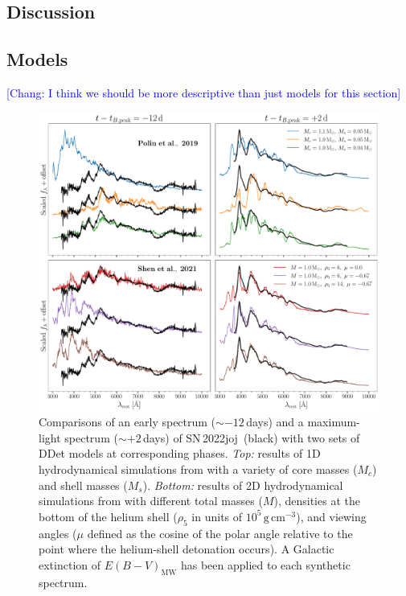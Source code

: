 \documentclass[twocolumn]{aastex631}
\newcommand{\sn}{SN\,2022joj}
\newcommand{\chang}[1]{\textcolor{blue}{[Chang: #1]}}
\begin{document}
\begin{CJK*}{UTF8}{gbsn}
\section{Discussion} \label{sec:discussion}
\subsection{Models} \label{sec:model}

\chang{I think we should be more descriptive than just models for this section}

\begin{figure}
    \centering
    \includegraphics[width=\linewidth]{model_comparison_spec.pdf}
    \caption{Comparisons of an early spectrum ($\sim$$-12$\,days) and a maximum-light spectrum ($\sim$$+2$\,days) of \sn\ (black) with two sets of DDet models at corresponding phases. \textit{Top:} results of 1D hydrodynamical simulations from \citet{polin_observational_2019} with a variety of core masses ($M_c$) and shell masses ($M_s$). \textit{Bottom:} results of 2D hydrodynamical simulations from \citep{Shen_2D_2021} with different total masses ($M$), densities at the bottom of the helium shell ($\rho_5$ in units of $10^{5}\,\mathrm{g\,cm^{-3}}$), and viewing angles ($\mu$ defined as the cosine of the polar angle relative to the point where the helium-shell detonation occurs). A Galactic extinction of $E(B-V)_\mathrm{MW}$ has been applied to each synthetic spectrum.}
    \label{fig:model_spec}
\end{figure}



\end{CJK*}
\end{document}
